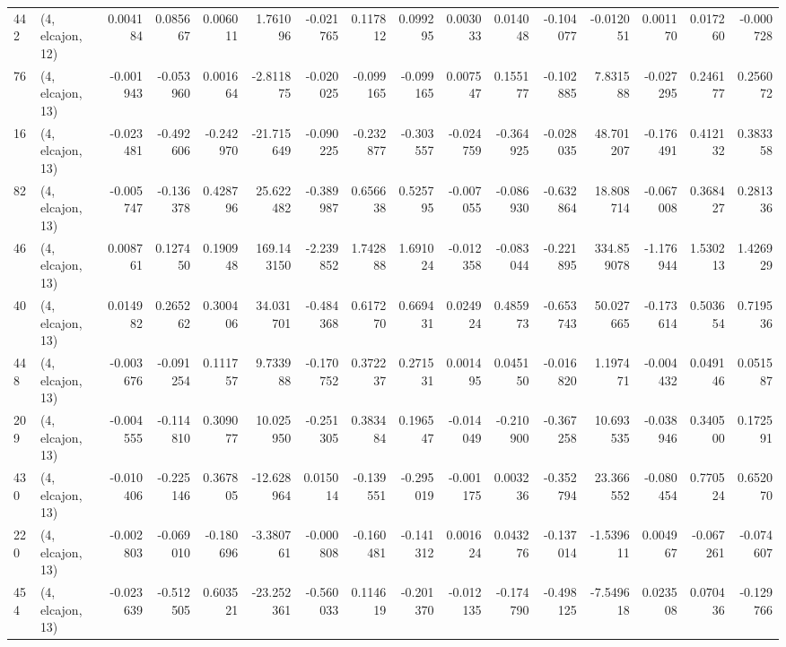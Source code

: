 \begin{tabular}{llrrrrrrrrrrrrrr}
442 &  (4, elcajon, 12) &   0.004184 &  0.085667 &  0.006011 &    1.761096 & -0.021765 &   0.117812 &   0.099295 &  0.003033 &  0.014048 & -0.104077 &   -0.012051 &  0.001170 &   0.017260 &  -0.000728 \\
76  &  (4, elcajon, 13) &  -0.001943 & -0.053960 &  0.001664 &   -2.811875 & -0.020025 &  -0.099165 &  -0.099165 &  0.007547 &  0.155177 & -0.102885 &    7.831588 & -0.027295 &   0.246177 &   0.256072 \\
16  &  (4, elcajon, 13) &  -0.023481 & -0.492606 & -0.242970 &  -21.715649 & -0.090225 &  -0.232877 &  -0.303557 & -0.024759 & -0.364925 & -0.028035 &   48.701207 & -0.176491 &   0.412132 &   0.383358 \\
82  &  (4, elcajon, 13) &  -0.005747 & -0.136378 &  0.428796 &   25.622482 & -0.389987 &   0.656638 &   0.525795 & -0.007055 & -0.086930 & -0.632864 &   18.808714 & -0.067008 &   0.368427 &   0.281336 \\
46  &  (4, elcajon, 13) &   0.008761 &  0.127450 &  0.190948 &  169.143150 & -2.239852 &   1.742888 &   1.691024 & -0.012358 & -0.083044 & -0.221895 &  334.859078 & -1.176944 &   1.530213 &   1.426929 \\
40  &  (4, elcajon, 13) &   0.014982 &  0.265262 &  0.300406 &   34.031701 & -0.484368 &   0.617270 &   0.669431 &  0.024924 &  0.485973 & -0.653743 &   50.027665 & -0.173614 &   0.503654 &   0.719536 \\
448 &  (4, elcajon, 13) &  -0.003676 & -0.091254 &  0.111757 &    9.733988 & -0.170752 &   0.372237 &   0.271531 &  0.001495 &  0.045150 & -0.016820 &    1.197471 & -0.004432 &   0.049146 &   0.051587 \\
209 &  (4, elcajon, 13) &  -0.004555 & -0.114810 &  0.309077 &   10.025950 & -0.251305 &   0.383484 &   0.196547 & -0.014049 & -0.210900 & -0.367258 &   10.693535 & -0.038946 &   0.340500 &   0.172591 \\
430 &  (4, elcajon, 13) &  -0.010406 & -0.225146 &  0.367805 &  -12.628964 &  0.015014 &  -0.139551 &  -0.295019 & -0.001175 &  0.003236 & -0.352794 &   23.366552 & -0.080454 &   0.770524 &   0.652070 \\
220 &  (4, elcajon, 13) &  -0.002803 & -0.069010 & -0.180696 &   -3.380761 & -0.000808 &  -0.160481 &  -0.141312 &  0.001624 &  0.043276 & -0.137014 &   -1.539611 &  0.004967 &  -0.067261 &  -0.074607 \\
454 &  (4, elcajon, 13) &  -0.023639 & -0.512505 &  0.603521 &  -23.252361 & -0.560033 &   0.114619 &  -0.201370 & -0.012135 & -0.174790 & -0.498125 &   -7.549618 &  0.023508 &   0.070436 &  -0.129766 \\

\end{tabular}

